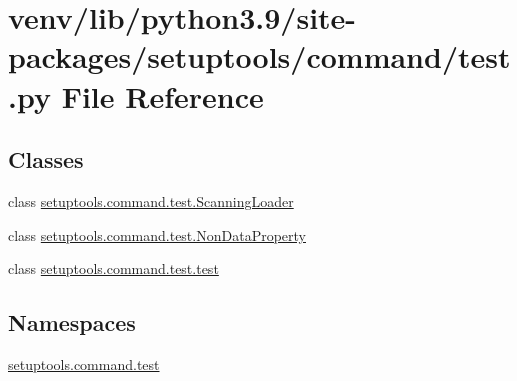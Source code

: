 \hypertarget{venv_2lib_2python3_89_2site-packages_2setuptools_2command_2test_8py}{}\section{venv/lib/python3.9/site-\/packages/setuptools/command/test.py File Reference}
\label{venv_2lib_2python3_89_2site-packages_2setuptools_2command_2test_8py}
\subsection*{Classes}
\begin{DoxyCompactItemize}
\item 
class \hyperlink{classsetuptools_1_1command_1_1test_1_1ScanningLoader}{setuptools.\+command.\+test.\+Scanning\+Loader}
\item 
class \hyperlink{classsetuptools_1_1command_1_1test_1_1NonDataProperty}{setuptools.\+command.\+test.\+Non\+Data\+Property}
\item 
class \hyperlink{classsetuptools_1_1command_1_1test_1_1test}{setuptools.\+command.\+test.\+test}
\end{DoxyCompactItemize}
\subsection*{Namespaces}
\begin{DoxyCompactItemize}
\item 
 \hyperlink{namespacesetuptools_1_1command_1_1test}{setuptools.\+command.\+test}
\end{DoxyCompactItemize}
